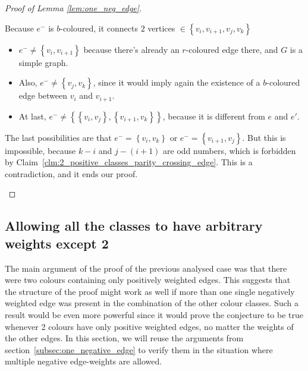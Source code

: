\begin{proof}[Proof of Lemma \ref{lem:one_neg_edge}]
\begin{enumerate}
\begin{enumerate}
                Because $e^-$ is $b$-coloured, it connects $2$ vertices $\in \left\{ v_i, v_{i+1}, v_j, v_k \right\}$
                \begin{itemize}
                    \item $e^- \neq \left\{ v_i, v_{i+1} \right\}$ because there's already an $r$-coloured edge there, and $G$ is a simple graph.
                    \item Also, $e^- \neq \left\{ v_j, v_k \right\}$, since it would imply again the existence of a $b$-coloured edge between $v_i$ and $v_{i+1}$.
                    \item At last, $e^- \neq \left\{ \left\{v_i, v_j\right\}, \left\{v_{i+1}, v_k\right\} \right\}$, because it is different from $e$ and $e'$.
                \end{itemize}

                The last possibilities are that $e^- = \left\{ v_i, v_k \right\}$ or $e^- = \left\{ v_{i+1}, v_j \right\}$.
                But this is impossible, because $k - i$ and $j - (i+1)$ are odd numbers, which is forbidden by Claim~\ref{clm:2_positive_classes_parity_crossing_edge}.
                This is a contradiction, and it ends our proof.
        \end{enumerate}
    \end{enumerate}
\end{proof}


\subsection{Allowing all the classes to have arbitrary weights except 2}
\label{subsec:2-pos-classes}

The main argument of the proof of the previous analysed case was that there were two colours containing only positively weighted edges.
This suggests that the structure of the proof might work as well if more than one single negatively weighted edge was present in the combination of the other colour classes.
Such a result would be even more powerful since it would prove the conjecture to be true whenever 2 colours have only positive weighted edges, no matter the weights of the other edges.
In this section, we will reuse the arguments from section~\ref{subsec:one_negative_edge} to verify them in the situation where multiple negative edge-weights are allowed.


